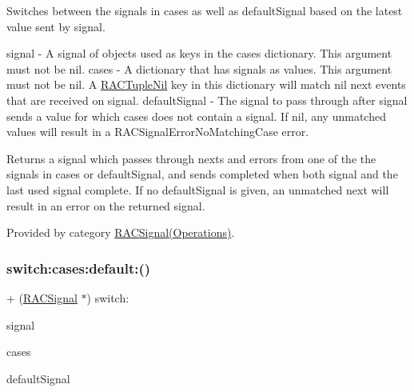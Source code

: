Switches between the signals in {\ttfamily cases} as well as {\ttfamily default\+Signal} based on the latest value sent by {\ttfamily signal}.

signal -\/ A signal of objects used as keys in the {\ttfamily cases} dictionary. This argument must not be nil. cases -\/ A dictionary that has signals as values. This argument must not be nil. A \mbox{\hyperlink{interface_r_a_c_tuple_nil}{R\+A\+C\+Tuple\+Nil}} key in this dictionary will match nil {\ttfamily next} events that are received on {\ttfamily signal}. default\+Signal -\/ The signal to pass through after {\ttfamily signal} sends a value for which {\ttfamily cases} does not contain a signal. If nil, any unmatched values will result in a R\+A\+C\+Signal\+Error\+No\+Matching\+Case error.

Returns a signal which passes through {\ttfamily next}s and {\ttfamily error}s from one of the the signals in {\ttfamily cases} or {\ttfamily default\+Signal}, and sends {\ttfamily completed} when both {\ttfamily signal} and the last used signal complete. If no {\ttfamily default\+Signal} is given, an unmatched {\ttfamily next} will result in an error on the returned signal. 

Provided by category \mbox{\hyperlink{category_r_a_c_signal_07_operations_08_aac7816b22cfdcbe65cd43d99836ba1f5}{R\+A\+C\+Signal(\+Operations)}}.

\mbox{\label{interface_r_a_c_signal_aac7816b22cfdcbe65cd43d99836ba1f5}} 
\subsubsection{\texorpdfstring{switch\+:cases\+:default\+:()}{switch:cases:default:()}\hspace{0.1cm}{\footnotesize\ttfamily [3/3]}}
{\footnotesize\ttfamily + (\mbox{\hyperlink{interface_r_a_c_signal}{R\+A\+C\+Signal}} $\ast$) switch\+: \begin{DoxyParamCaption}\item[{(\mbox{\hyperlink{interface_r_a_c_signal}{R\+A\+C\+Signal}} $\ast$)}]{signal }\item[{cases:(N\+S\+Dictionary $\ast$)}]{cases }\item[{default:(\mbox{\hyperlink{interface_r_a_c_signal}{R\+A\+C\+Signal}} $\ast$)}]{default\+Signal }\end{DoxyParamCaption}}

